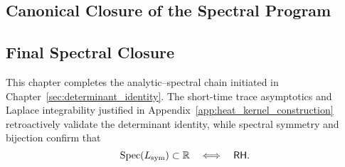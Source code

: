 








\subsection{Canonical Closure of the Spectral Program}
\label{sec:canonical_closure}




\subsection{Final Spectral Closure}
\label{sec:spectral_final_closure}






\begin{remark}
This chapter completes the analytic–spectral chain initiated in Chapter~\ref{sec:determinant_identity}. The short-time trace asymptotics and Laplace integrability justified in Appendix~\ref{app:heat_kernel_construction} retroactively validate the determinant identity, while spectral symmetry and bijection confirm that
\[
\operatorname{Spec}(L_{\mathrm{sym}}) \subset \mathbb{R} \quad \Longleftrightarrow \quad \mathsf{RH}.
\]
\end{remark}
